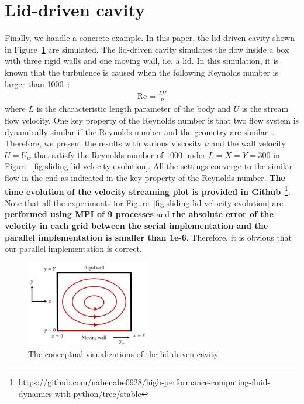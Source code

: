 \section{Lid-driven cavity}
Finally, we handle a concrete example.
In this paper, the lid-driven cavity shown in Figure~\ref{lid-driven-cavity-conceptual} are simulated.
The lid-driven cavity simulates the flow inside a box with
three rigid walls and one moving wall, i.e. a lid.
In this simulation, it is known that the turbulence is caused 
when the following Reynolds number is larger than 1000~\cite{chiang1998effect}:
\begin{equation}
\begin{aligned}
  \text{Re} = \frac{LU}{\nu}
\end{aligned}
\end{equation}
where $L$ is the characteristic length parameter
of the body and $U$ is the stream flow velocity.
One key property of the Reynolds number is that two flow system
is dynamically similar if the Reynolds number and the geometry are similar~\cite{kundu2008fluid}.
Therefore, we present the results with various 
viscosity $\nu$ and the wall velocity $U = U_w$ that 
satisfy the Reynolds number of $1000$ under $L = X = Y = 300$
in Figure~\ref{fig:sliding-lid-velocity-evolution}.
All the settings converge to the similar flow in the end
as indicated in the key property of the Reynolds number.
{\bf The time evolution of the velocity streaming plot is provided in
Github}~\footnote{https://github.com/nabenabe0928/high-performance-computing-fluid-dynamics-with-python/tree/stable}.
Note that all the experiments for Figure~\ref{fig:sliding-lid-velocity-evolution}
are {\bf performed using MPI of 9 processes}
and {\bf the absolute error of the velocity in each grid between the serial implementation
and the parallel implementation is smaller than 1e-6}.
Therefore, it is obvious that our parallel implementation is correct.

\begin{figure}[t]
  \centering
  \includegraphics[width=0.48\textwidth]{imgs/lid-driven-cavity.pdf}
  \caption{The conceptual visualizations of the lid-driven cavity.}
  \label{lid-driven-cavity-conceptual}
\end{figure}

